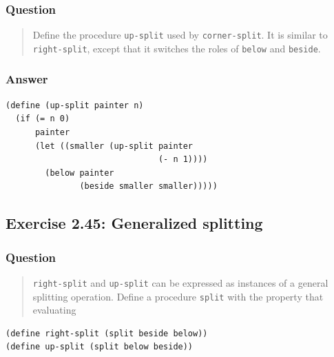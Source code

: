 \documentclass[final,fleqn,titlepage,twoside]{article}
\begin{document}
\subsubsection{Question}
\label{sec:org060f3af}
\begin{quote}
Define the procedure \texttt{up-split} used by \texttt{corner-split}. It
is similar to \texttt{right-split}, except that it switches the roles of
\texttt{below} and \texttt{beside}.
\end{quote}

\subsubsection{Answer}
\label{sec:org69f5b86}
\begin{verbatim}
(define (up-split painter n)
  (if (= n 0)
      painter
      (let ((smaller (up-split painter 
                               (- n 1))))
        (below painter 
               (beside smaller smaller)))))
\end{verbatim}

\subsection{Exercise 2.45: Generalized splitting}
\label{sec:orgd32ea38}
\subsubsection{Question}
\label{sec:org1984ba6}
\begin{quote}
\texttt{right-split} and \texttt{up-split} can be expressed as instances
of a general splitting operation. Define a procedure \texttt{split} with the
property that evaluating
\end{quote}

\begin{verbatim}
(define right-split (split beside below))
(define up-split (split below beside))
\end{verbatim}
\end{document}
